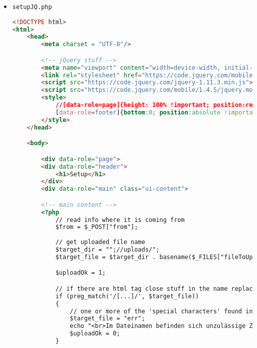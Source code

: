 \documentclass{scrartcl}
\begin{document}
\begin{itemize}
\begin{lstlisting}[language=html]
		</div>

			<!-- footer -->
			<div data-role="footer"><div data-role="navbar"><ul><li>

				<!-- Option 1 -->
				<start>
					<form action="startJQ.php">
						<input type="submit" value="Auswahl" />
					</form>
				</start>

			</li><li>

				<!-- Option 2 -->
				<statistic>
					<form action="statisticJQ.php">
						<input type="submit" value="Statistik" />
					</form>
				</statistic>

			</li><li>

				<!-- Option 3 -->
				<setup>
					<form action="setupJQ.php">
						<input type="submit" value="Setup" />
					</form>
				</setup>

			</li></ul></div></div>
		</div> 
	</body>
</html>
\end{lstlisting}
\item \lstinline`setupJQ.php`
\begin{lstlisting}[language=html]
<!DOCTYPE html>
<html>
	<head>
		<meta charset = "UTF-8"/>

		<!-- jQuery stuff -->
		<meta name="viewport" content="width=device-width, initial-scale=1">
		<link rel="stylesheet" href="https://code.jquery.com/mobile/1.4.5/jquery.mobile-1.4.5.min.css">
		<script src="https://code.jquery.com/jquery-1.11.3.min.js"></script>
		<script src="https://code.jquery.com/mobile/1.4.5/jquery.mobile-1.4.5.min.js"></script>
		<style>
			//[data-role=page]{height: 100% !important; position:relative !important;}
			[data-role=footer]{bottom:0; position:absolute !important; top: auto !important; width:100%;}
		</style>
	</head>

	<body>	

		<div data-role="page">
		<div data-role="header">
			<h1>Setup</h1>
		</div>
		<div data-role="main" class="ui-content">

		<!-- main content -->
		<?php
			// read info where it is coming from
			$from = $_POST["from"];
		
			// get uploaded file name
			$target_dir = "";//uploads/";
			$target_file = $target_dir . basename($_FILES["fileToUpload"]	["name"]);

			$uploadOk = 1;

			// if there are html tag close stuff in the name replace the name with err			
			if (preg_match('/[...]/', $target_file))
			{
				// one or more of the 'special characters' found in $string
				$target_file = "err";
				echo "<br>Im Dateinamen befinden sich unzulässige Zeichen.";
				$uploadOk = 0;
			}
			


\end{lstlisting}
\end{itemize}
\end{document}
